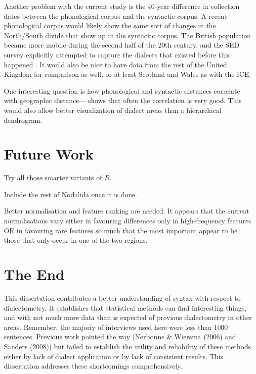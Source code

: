 Another problem with the current study is the 40-year difference in
collection dates between the phonological corpus and the syntactic
corpus. A recent phonological corpus would likely show the same sort
of changes in the North/South divide that show up in the syntactic
corpus. The British population became more mobile during the second
half of the 20th century, and the SED survey explicitly attempted to capture
the dialects that existed before this happened \cite{orton78}.
It would also be nice to have data from the rest of the United Kingdom for
comparison as well, or at least Scotland and Wales as with the ICE.



One interesting question is
how phonological and syntactic distances correlate with geographic
distance--- shows that often the correlation is
very good. This would also allow better visualization of dialect areas
than a hierarchical dendrogram.

\section{Future Work}

Try all those smarter variants of $R$.

Include the rest of Nodalida once it is done.

Better normalisation and feature ranking are needed. It appears that
the current normalisations vary either in favouring differences
only in high-frequency features OR in favouring rare features so much
that the most important appear to be those that only occur in one of
the two regions.

\section{The End}

This dissertation contributes a better understanding of syntax with
respect to dialectometry. It establishes that statistical methods can
find interesting things, and with not much more data than is expected
of previous dialectometry in other areas. Remember, the majoriy of
interviews used here were less than 1000 sentences. Previous work
pointed the way (Nerbonne \& Wiersma (2006) and Sanders (2008)) but
failed to establish the utility and reliability of these methods
either by lack of dialect application or by lack of consistent
results. This dissertation addresses these shortcomings
comprehensively.

